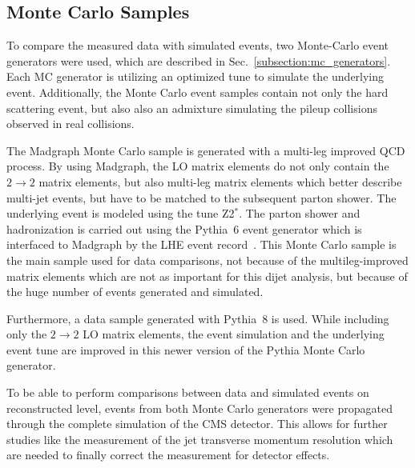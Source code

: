 \subsection{Monte Carlo Samples}

To compare the measured data with simulated events, two
Monte-Carlo event generators were used, which are described in
Sec.~\ref{subsection:mc_generators}. Each MC generator is utilizing an optimized
tune to simulate the underlying event. Additionally, the Monte Carlo event samples
contain not only the hard scattering event, but also also an admixture
simulating the pileup collisions observed in real collisions.

The Madgraph Monte Carlo sample is generated with a multi-leg improved QCD
process. By using Madgraph, the LO matrix elements do not only contain the $2
\rightarrow 2$ matrix elements, but also multi-leg matrix elements which better
describe multi-jet events, but have to be matched to the subsequent parton
shower. The underlying event is modeled using the tune Z2$^*$. The parton shower
and hadronization is carried out using the Pythia~6 event generator which is
interfaced to Madgraph by the LHE event record~\cite{Alwall:2006yp}. This Monte
Carlo sample is the main sample used for data comparisons, not because of the
multileg-improved matrix elements which are not as important for this dijet
analysis, but because of the huge number of events generated and simulated.

Furthermore, a data sample generated with Pythia~8 is used. While including only the $2
\rightarrow 2$ LO matrix elements, the event simulation and the underlying event
tune are improved in this newer version of the Pythia Monte Carlo generator.

To be able to perform comparisons between data and simulated events on
reconstructed level, events from both Monte Carlo generators were propagated
through the complete simulation of the CMS detector. This allows for further
studies like the measurement of the jet transverse momentum resolution which are
needed to finally correct the measurement for detector effects.

